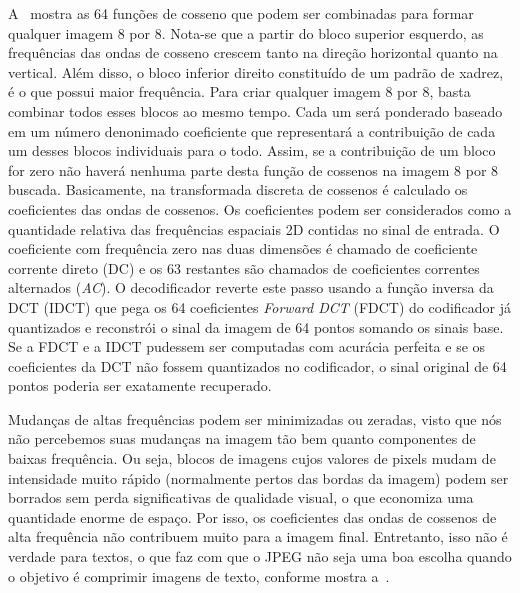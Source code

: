 A~ mostra as 64 funções de cosseno que podem ser combinadas para formar qualquer imagem 8 por 8. Nota-se que a partir do bloco superior esquerdo, as frequências das ondas de cosseno crescem tanto na direção horizontal quanto na vertical. Além disso, o bloco inferior direito constituído de um padrão de xadrez, é o que possui maior frequência. Para criar qualquer imagem 8 por 8, basta combinar todos esses blocos ao mesmo tempo. Cada um será ponderado baseado em um número denonimado coeficiente que representará a contribuição de cada um desses blocos individuais para o todo. Assim, se a contribuição de um bloco for zero não haverá nenhuma parte desta função de cossenos na imagem 8 por 8 buscada. Basicamente, na transformada discreta de cossenos é calculado os coeficientes das ondas de cossenos. Os coeficientes podem ser considerados como a quantidade relativa das frequências espaciais 2D contidas no sinal de entrada. O coeficiente com frequência zero nas duas dimensões é chamado de coeficiente corrente direto (\acrshort{DC}) e os 63 restantes são chamados de coeficientes correntes alternados (\textit{AC}). O decodificador reverte este passo usando a função inversa da DCT (\acrshort{IDCT}) que pega os 64 coeficientes \textit{Forward DCT} (\acrshort{FDCT}) do codificador já quantizados e reconstrói o sinal da imagem de 64 pontos somando os sinais base. Se a \acrshort{FDCT} e a \acrshort{IDCT} pudessem ser computadas com acurácia perfeita e se os coeficientes da \acrshort{DCT} não fossem quantizados no codificador, o sinal original de 64 pontos poderia ser exatamente recuperado.


Mudanças de altas frequências podem ser minimizadas ou zeradas, visto que nós não percebemos suas mudanças na imagem tão bem quanto componentes de baixas frequência. Ou seja, blocos de imagens cujos valores de pixels mudam de intensidade muito rápido (normalmente pertos das bordas da imagem) podem ser borrados sem perda significativas de qualidade visual, o que economiza uma quantidade enorme de espaço. Por isso, os coeficientes das ondas de cossenos de alta frequência não contribuem muito para a imagem final. Entretanto, isso não é verdade para textos, o que faz com que o JPEG não seja uma boa escolha quando o objetivo é comprimir imagens de texto, conforme mostra a~.
